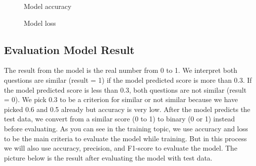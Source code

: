 \documentclass[12pt,oneside,openright,a4paper]{cpe-english-project}
\begin{document}
\begin{figure}[!h]\centering
{}
\caption{Model accuracy}\label{fig:Model accuracy}
\end{figure}
\begin{figure}[!h]\centering
{}
\caption{Model loss}\label{fig:Model loss}
\end{figure}

\subsection{Evaluation Model Result}
The result from the model is the real number from 0 to 1. We interpret both questions are similar (result = 1) if the model predicted score is more than 0.3. If the model predicted score is less than 0.3, both questions are not similar (result = 0). We pick 0.3 to be a criterion for similar or not similar because we have picked 0.6 and 0.5 already but accuracy is very low. After the model predicts the test data, we convert from a similar score (0 to 1)  to binary (0 or 1) instead before evaluating. As you can see in the training topic, we use accuracy and loss to be the main criteria to evaluate the model while training. But in this process we will also use accuracy, precision, and F1-score to evaluate the model. The picture below is the result after evaluating the model with test data.
\end{document}
